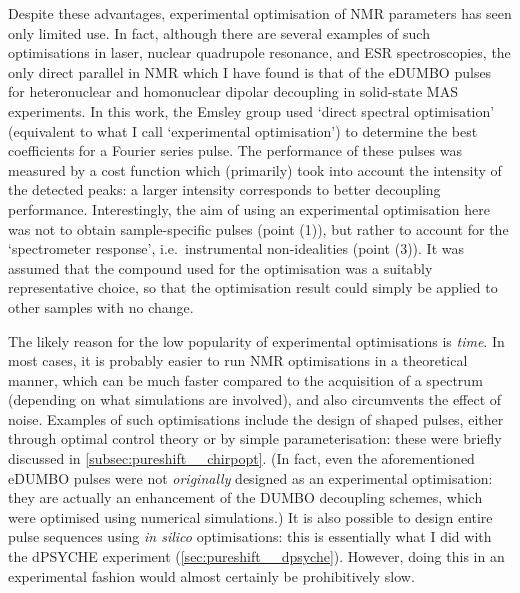 Despite these advantages, experimental optimisation of NMR parameters has seen only limited use.
In fact, although there are several examples of such optimisations in laser\autocite{Bardeen1997CPL}, nuclear quadrupole resonance\autocite{Schiano1999JMR,Schiano2000ZNA,Monea2020JMR}, and ESR\autocite{Goodwin2018JMR} spectroscopies, 
the only direct parallel in NMR which I have found is that of the eDUMBO pulses for heteronuclear\autocite{DePaepe2003CPL,Elena2004CPL} and homonuclear dipolar\autocite{Salager2010CPL} decoupling in solid-state MAS experiments.
In this work, the Emsley group used `direct spectral optimisation' (equivalent to what I call `experimental optimisation') to determine the best coefficients for a Fourier series pulse.
The performance of these pulses was measured by a cost function which (primarily) took into account the intensity of the detected peaks: a larger intensity corresponds to better decoupling performance.
Interestingly, the aim of using an experimental optimisation here was not to obtain sample-specific pulses (point (1)), but rather to account for the `spectrometer response', i.e.\ instrumental non-idealities (point (3)).
It was assumed that the compound used for the optimisation was a suitably representative choice, so that the optimisation result could simply be applied to other samples with no change.

The likely reason for the low popularity of experimental optimisations is \textit{time}.
In most cases, it is probably easier to run NMR optimisations in a theoretical manner, which can be much faster compared to the acquisition of a spectrum (depending on what simulations are involved), and also circumvents the effect of noise.
Examples of such optimisations include the design of shaped pulses, either through optimal control theory\autocite{Skinner2003JMR,Khaneja2005JMR,Kobzar2008JMR,Kobzar2012JMR,Schilling2014ACIE,Glaser2015EPJD} or by simple parameterisation\autocite{Geen1989JMR,Emsley1990CPL,Geen1991JMR,Nuzillard1994JMRSA,Kupce1995JMRSA,Kupce1995JMRSB}: these were briefly discussed in \cref{subsec:pureshift__chirpopt}.
(In fact, even the aforementioned eDUMBO pulses were not \textit{originally} designed as an experimental optimisation: they are actually an enhancement of the DUMBO decoupling schemes, which were optimised using numerical simulations\autocite{Sakellariou2000CPL}.)
It is also possible to design entire pulse sequences using \textit{in silico} optimisations\autocite{Shaka1985JMR,Freeman1987JMR,Bechmann2013JMR,Ehni2014JMR,Lapin2020JMR}: this is essentially what I did with the dPSYCHE experiment (\cref{sec:pureshift__dpsyche}).
However, doing this in an experimental fashion would almost certainly be prohibitively slow.


